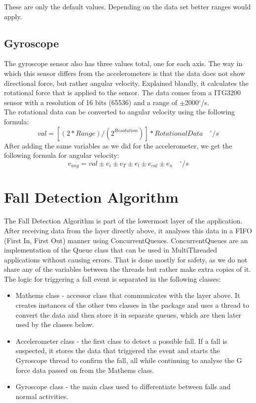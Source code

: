 \documentclass[hidelinks,conference,12pt]{IEEETran}
\begin{document}
These are only the default values. Depending on the data set better ranges would apply.

\subsection{Gyroscope}
The gyroscope sensor also has three values total, one for each axis. The way in which this sensor differs from the accelerometers is that the data does not show directional force, but rather angular velocity. Explained blandly, it calculates the rotational force that is applied to the sensor. The data comes from a ITG3200 sensor with a resolution of 16 bits (65536) and a range of $\pm$2000$^{\circ}$/s. \\
The rotational data can be converted to angular velocity using the following formula:
$$ val = [(2*Range)/(2^{Resolution})] * Rotational Data \quad ^{\circ}/s $$
After adding the same variables as we did for the accelerometer, we get the following formula for angular velocity:
$$ v_{ang} = val \pm e_i  \pm e_T \pm e_l \pm e_{cal} \pm e_n \quad ^{\circ}/s $$


\section{Fall Detection Algorithm}
The Fall Detection Algorithm is part of the lowermost layer of the application. After receiving data from the layer directly above, it analyses this data in a FIFO (First In, First Out) manner using ConcurrentQueues. ConcurrentQueues are an implementation of the Queue class that can be used in MultiThreaded applications without causing errors. That is done mostly for safety, as we do not share any of the variables between the threads but rather make extra copies of it. The logic for triggering a fall event is separated in the following classes:
\begin{itemize}
	\item Mathems class - accessor class that communicates with the layer above. It creates instances of the other two classes in the package and uses a thread to convert the data and then store it in separate queues, which are then later used by the classes below.
	\item Accelerometer class - the first class to detect a possible fall. If a fall is suspected, it stores the data that triggered the event and starts the Gyroscope thread to confirm the fall, all while continuing to analyse the G force data passed on from the Mathems class.
	\item Gyroscope class - the main class used to differentiate between falls and normal activities.
\end{itemize}
\end{document}
